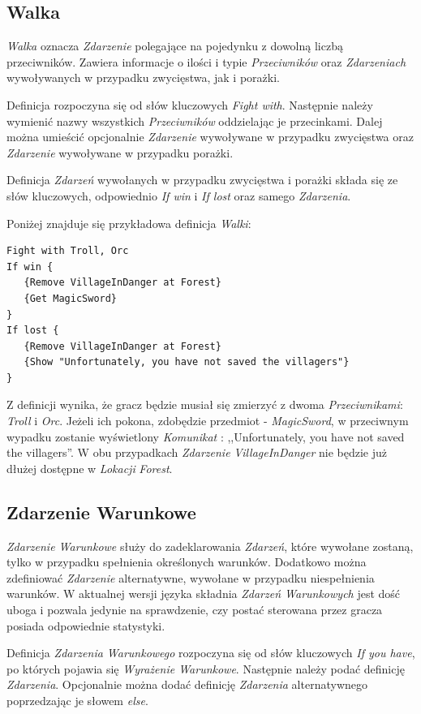 \documentclass[openright]{xmgr}
\begin{document}
\subsection*{Walka}
\textit{Walka} oznacza \textit{Zdarzenie} polegające na pojedynku z dowolną liczbą przeciwników. Zawiera informacje o ilości i typie \textit{Przeciwników} oraz \textit{Zdarzeniach} wywoływanych w przypadku zwycięstwa, jak i porażki.

Definicja rozpoczyna się od słów kluczowych \textit{Fight with}. Następnie należy wymienić nazwy wszystkich \textit{Przeciwników} oddzielając je przecinkami. Dalej można umieścić opcjonalnie \textit{Zdarzenie} wywoływane w przypadku zwycięstwa oraz \textit{Zdarzenie} wywoływane w przypadku porażki.

Definicja \textit{Zdarzeń} wywołanych w przypadku zwycięstwa i porażki składa się ze słów kluczowych, odpowiednio \textit{If win} i \textit{If lost} oraz samego \textit{Zdarzenia}.

Poniżej znajduje się przykładowa definicja \textit{Walki}:
\begin{verbatim}
Fight with Troll, Orc
If win {
   {Remove VillageInDanger at Forest}
   {Get MagicSword}
}
If lost {
   {Remove VillageInDanger at Forest}
   {Show "Unfortunately, you have not saved the villagers"}
}
\end{verbatim}

Z definicji wynika, że gracz będzie musiał się zmierzyć z dwoma \textit{Przeciwnikami}: \textit{Troll} i \textit{Orc}. Jeżeli ich pokona, zdobędzie przedmiot - \textit{MagicSword}, w przeciwnym wypadku zostanie wyświetlony \textit{Komunikat} : ,,Unfortunately, you have not saved the villagers''. W obu przypadkach \textit{Zdarzenie} \textit{VillageInDanger} nie będzie już dłużej dostępne w \textit{Lokacji} \textit{Forest}.

\subsection*{Zdarzenie Warunkowe}
\textit{Zdarzenie Warunkowe} służy do zadeklarowania \textit{Zdarzeń}, które wywołane zostaną, tylko w przypadku spełnienia określonych warunków. Dodatkowo można zdefiniować \textit{Zdarzenie} alternatywne, wywołane w przypadku niespełnienia warunków. W aktualnej wersji języka składnia \textit{Zdarzeń Warunkowych} jest dość uboga i pozwala jedynie na sprawdzenie, czy postać sterowana przez gracza posiada odpowiednie statystyki.

Definicja \textit{Zdarzenia Warunkowego} rozpoczyna się od słów kluczowych \textit{If you have}, po których pojawia się \textit{Wyrażenie Warunkowe}. Następnie należy podać definicję \textit{Zdarzenia}. Opcjonalnie można dodać definicję \textit{Zdarzenia} alternatywnego poprzedzając je słowem \textit{else}.
\end{document}
